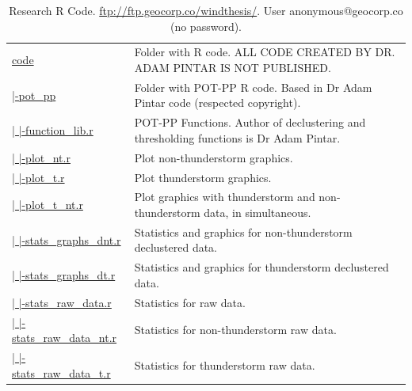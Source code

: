 \documentclass[12pt,oneside]{reedthesis}
\begin{document}
\begingroup\fontsize{7}{9}\selectfont
\begin{longtable}[t]{>{\raggedright\arraybackslash}p{1.3in}>{\raggedright\arraybackslash}p{4.9in}}
\caption[Research R Code]{\label{tab:code}Research R Code. \href{ftp://ftp.geocorp.co/windthesis/}{ftp://ftp.geocorp.co/windthesis/}. User anonymous@geocorp.co (no password).}\\
\toprule
\multicolumn{1}{l}{Folder Tree - Ftp Links} & \multicolumn{1}{l}{Description}\\
\midrule
\href{ftp://ftp.geocorp.co/windthesis/code/}{code} & Folder with R code. ALL CODE CREATED BY DR. ADAM PINTAR IS NOT PUBLISHED.\\
\href{ftp://ftp.geocorp.co/windthesis/code/pot_pp/}{  |-pot\_pp} & Folder with POT-PP R code. Based in Dr Adam Pintar code (respected copyright).\\
\href{ftp://ftp.geocorp.co/windthesis/code/pot_pp/function_lib.r}{  |    |-function\_lib.r} & POT-PP Functions. Author of declustering and thresholding functions is Dr Adam Pintar.\\
\href{ftp://ftp.geocorp.co/windthesis/code/pot_pp/plot_nt.r}{  |    |-plot\_nt.r} & Plot non-thunderstorm graphics.\\
\href{ftp://ftp.geocorp.co/windthesis/code/pot_pp/plot_t.r}{  |    |-plot\_t.r} & Plot thunderstorm graphics.\\
\href{ftp://ftp.geocorp.co/windthesis/code/pot_pp/plot_t_nt.r}{  |    |-plot\_t\_nt.r} & Plot graphics with thunderstorm and non-thunderstorm data, in simultaneous.\\
\href{ftp://ftp.geocorp.co/windthesis/code/pot_pp/statistics_and_graphics_declustered_nt.r}{  |    |-stats\_graphs\_dnt.r} & Statistics and graphics for non-thunderstorm declustered data.\\
\href{ftp://ftp.geocorp.co/windthesis/code/pot_pp/statistics_and_graphics_declustered_t.r}{  |    |-stats\_graphs\_dt.r} & Statistics and graphics for thunderstorm declustered data.\\
\href{ftp://ftp.geocorp.co/windthesis/code/pot_pp/statistics_raw_data.r}{  |    |-stats\_raw\_data.r} & Statistics for raw data.\\
\href{ftp://ftp.geocorp.co/windthesis/code/pot_pp/statistics_raw_data_nt.r}{  |    |-stats\_raw\_data\_nt.r} & Statistics for non-thunderstorm raw data.\\
\href{ftp://ftp.geocorp.co/windthesis/code/pot_pp/statistics_raw_data_t.r}{  |    |-stats\_raw\_data\_t.r} & Statistics for thunderstorm raw data.\\

\end{longtable}
\end{document}
